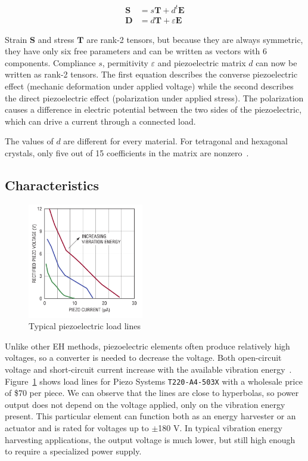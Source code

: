 \documentclass[a4paper,10pt]{article}
\renewcommand{\vec}{\mathbf}
\begin{document}
\begin{align}
 \vec S &= s \vec T + d^t \vec E \\
 \vec D &= d \vec T + \varepsilon \vec E
\end{align}

Strain $\vec S$ and stress $\vec T$ are rank-2 tensors, but because they are always symmetric, they have only six free parameters and can be written as vectors with 6 components. Compliance $s$, permitivity $\varepsilon$ and piezoelectric matrix $d$ can now be written as rank-2 tensors. The first equation describes the converse piezoelectric effect (mechanic deformation under applied voltage) while the second describes the direct piezoelectric effect (polarization under applied stress). The polarization causes a difference in electric potential between the two sides of the piezoelectric, which can drive a current through a connected load. 

The values of $d$ are different for every material. For tetragonal and hexagonal crystals, only five out of 15 coefficients in the matrix are nonzero~\cite{wiki:piezo}. 

\subsection{Characteristics}

\begin{figure}
\centering
  \includegraphics[width=0.45\textwidth]{./Slike/Piezo-UI}
\caption{Typical piezoelectric load lines~\cite{LT-Piezo}}
\label{fig:piezo-load}
\end{figure}

Unlike other \ac{EH} methods, piezoelectric elements often produce relatively high voltages, so a converter is needed to decrease the voltage. Both open-circuit voltage and short-circuit current increase with the available vibration energy~\cite{LT-Piezo}. Figure~\ref{fig:piezo-load} shows load lines for Piezo Systems \texttt{T220-A4-503X} with a wholesale price of \$70 per piece. We can observe that the lines are close to hyperbolas, so power output does not depend on the voltage applied, only on the vibration energy present. This particular element can function both as an energy harvester or an actuator and is rated for voltages up to $\pm$180 V. In typical vibration energy harvesting applications, the output voltage is much lower, but still high enough to require a specialized power supply. 
\end{document}
